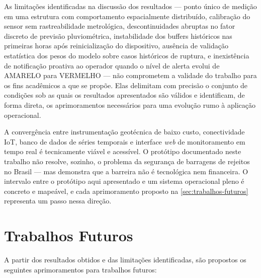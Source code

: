 As limitações identificadas na discussão dos resultados --- ponto único
de medição em uma estrutura com comportamento espacialmente
distribuído, calibração do sensor sem rastreabilidade metrológica,
descontinuidades abruptas no fator discreto de previsão pluviométrica,
instabilidade dos buffers históricos nas primeiras horas após
reinicialização do dispositivo, ausência de validação estatística dos
pesos do modelo sobre casos históricos de ruptura, e inexistência de
notificação proativa ao operador quando o nível de alerta evolui de
AMARELO para VERMELHO --- não comprometem a validade do trabalho para
os fins acadêmicos a que se propõe. Elas delimitam com precisão o
conjunto de condições sob as quais os resultados apresentados são
válidos e identificam, de forma direta, os aprimoramentos necessários
para uma evolução rumo à aplicação operacional.

A convergência entre instrumentação geotécnica de baixo custo,
conectividade IoT, banco de dados de séries temporais e interface
\textit{web} de monitoramento em tempo real é tecnicamente viável e
acessível. O protótipo documentado neste trabalho não resolve, sozinho,
o problema da segurança de barragens de rejeitos no Brasil --- mas
demonstra que a barreira não é tecnológica nem financeira. O intervalo
entre o protótipo aqui apresentado e um sistema operacional pleno é
concreto e mapeável, e cada aprimoramento proposto na
\autoref{sec:trabalhos-futuros} representa um passo nessa direção.

\section{Trabalhos Futuros}
\label{sec:trabalhos-futuros}

A partir dos resultados obtidos e das limitações identificadas, são
propostos os seguintes aprimoramentos para trabalhos futuros:

